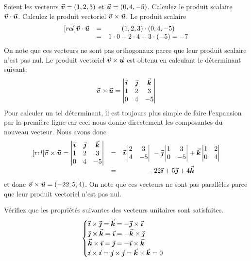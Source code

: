 \begin{exemple}\label{exemple-prod-vect}
Soient les vecteurs $\vec{\boldsymbol{v}} = (1, 2, 3)$ et $\vec{\boldsymbol{u}} = (0, 4, -5)$.
 Calculez le produit scalaire $\vec{\boldsymbol{v}}\cdot\vec{\boldsymbol{u}}$.
 Calculez le produit vectoriel $\vec{\boldsymbol{v}}\times \vec{\boldsymbol{u}}$.
\solution
{} Le produit  scalaire 
\[
\begin{matrix}[rcl]
\vec{\boldsymbol{v}}\cdot\vec{\boldsymbol{u}} &=& (1, 2, 3) \cdot (0, 4, -5) \\
 &=& 1\cdot 0 + 2\cdot 4 + 3\cdot (-5) = -7 
\end{matrix}
\]
On note que ces vecteurs ne sont pas orthogonaux parce que leur produit
scalaire n'est pas nul.
 Le produit vectoriel $\vec{\boldsymbol{v}}\times \vec{\boldsymbol{u}}$ est obtenu
en calculant le déterminant suivant:
\[
\vec{\boldsymbol{v}}\times \vec{\boldsymbol{u}} = \begin{vmatrix}
\vec{\boldsymbol{\imath}} & \vec{\boldsymbol{\jmath}} & \vec{\boldsymbol{k}} \\
1 & 2 & 3 \\
0 & 4 & -5
\end{vmatrix}
\] 
Pour calculer un tel déterminant, il est toujours plus simple de faire l'expansion
par la première ligne car ceci nous donne directement les composantes du nouveau vecteur.
Nous avons donc
\[
\begin{matrix}[rcl]
\vec{\boldsymbol{v}}\times \vec{\boldsymbol{u}}= \begin{vmatrix}
\vec{\boldsymbol{\imath}} & \vec{\boldsymbol{\jmath}} & \vec{\boldsymbol{k}} \\
1 & 2 & 3 \\
0 & 4 & -5
\end{vmatrix} &=& \vec{\boldsymbol{\imath}} \begin{vmatrix}
2 & 3 \\ 4 & -5
\end{vmatrix}\
-\vec{\boldsymbol{\jmath}} \begin{vmatrix}
1 & 3 \\ 0 & -5
\end{vmatrix} 
+ \vec{\boldsymbol{k}} \begin{vmatrix}
1 & 2 \\ 0 & 4
\end{vmatrix} \\
&=& -22 \vec{\boldsymbol{\imath}} + 5 \vec{\boldsymbol{\jmath}} + 4\vec{\boldsymbol{k}}
\end{matrix}
\] 
et donc 
$\vec{\boldsymbol{v}}\times \vec{\boldsymbol{u}} = (-22, 5, 4)$.  
On note que ces vecteurs ne sont pas parallèles parce que leur produit vectoriel
n'est pas nul.
\end{exemple}

\begin{exerciceC}\label{ex:prop-vect}
Vérifiez que les propriétés suivantes des vecteurs unitaires sont satisfaites.
\[
\begin{cases}
\vec{\boldsymbol{\imath}}\times\vec{\boldsymbol{\jmath}}=\vec{\boldsymbol{k}} = -\vec{\boldsymbol{\jmath}}\times\vec{\boldsymbol{\imath}}\\
\vec{\boldsymbol{\jmath}}\times\vec{\boldsymbol{k}}=\vec{\boldsymbol{\imath}} = -\vec{\boldsymbol{k}}\times\vec{\boldsymbol{\jmath}}\\
\vec{\boldsymbol{k}}\times\vec{\boldsymbol{\imath}}=\vec{\boldsymbol{\jmath}} = -\vec{\boldsymbol{\imath}}\times\vec{\boldsymbol{k}}\\
\vec{\boldsymbol{\imath}}\times\vec{\boldsymbol{\imath}}=\vec{\boldsymbol{\jmath}}\times\vec{\boldsymbol{\jmath}}=\vec{\boldsymbol{k}}\times\vec{\boldsymbol{k}}=0\end{cases}\]
\suggestion{$\iunit = (1, 0, 0)$}
\end{exerciceC}

